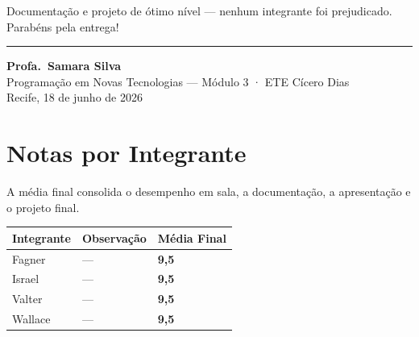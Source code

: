 \documentclass[
  sigconf,
  nonacm,
  language=portuguese
]{acmart}
\begin{document}
Documentação e projeto de ótimo nível --- nenhum integrante foi prejudicado. Parabéns pela entrega!

\vspace{1.5em}
\noindent\rule{\linewidth}{0.4pt}

\begin{flushright}
\textbf{Profa.\ Samara Silva}\\
{\small\color{cmuted} Programação em Novas Tecnologias --- Módulo 3 · ETE Cícero Dias}\\
{\small\color{cmuted} Recife, 18 de junho de 2026}
\end{flushright}

\appendix
\onecolumn
\section{Notas por Integrante}

A média final consolida o desempenho em sala, a documentação, a apresentação e o projeto final.

\vspace{0.5em}
\begin{tabularx}{\linewidth}{@{} X p{3cm} p{2.5cm} @{}}
\toprule
\textbf{Integrante} & \textbf{Observação} & \textbf{Média Final} \\
\midrule
Fagner & --- & \textbf{9,5} \\
Israel & --- & \textbf{9,5} \\
Valter & --- & \textbf{9,5} \\
Wallace & --- & \textbf{9,5} \\
\bottomrule
\end{tabularx}
\end{document}

